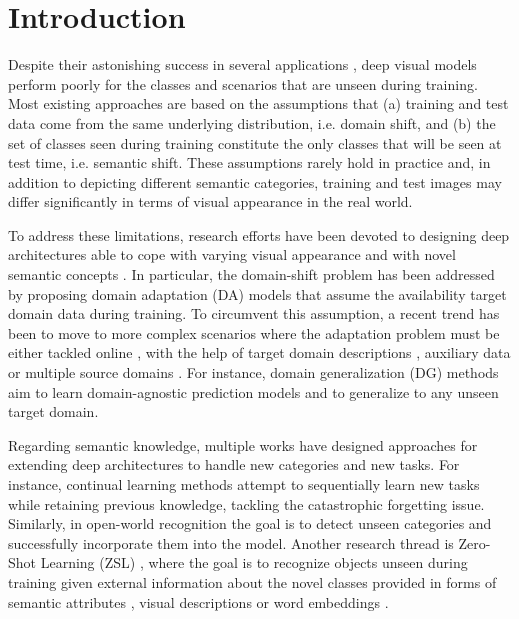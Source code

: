 \documentclass[runningheads]{llncs}
\begin{document}
\section{Introduction}
Despite their astonishing success in several applications \cite{girshick2015fast,redmon2016you}, deep visual models perform poorly for the classes and scenarios that are unseen during training. 
Most existing approaches are based on the assumptions that (a) training and test data come from the same underlying distribution, i.e. domain shift, and (b) the set of classes seen during training constitute the only classes that will be seen at test time, i.e. semantic shift.  
These assumptions rarely hold in practice and, in addition to depicting different semantic categories, training and test images may differ significantly in terms of visual appearance in the real world.


To address these limitations, research efforts have been devoted to designing deep architectures able to cope with varying visual appearance \cite{csurka2017domain} and with novel semantic concepts \cite{xian2018zeroshotgood}.
In particular, the domain-shift problem \cite{khosla2012undoing} has been addressed by proposing domain adaptation (DA) models \cite{csurka2017domain} that assume the availability target domain data during 
training. To circumvent this assumption, a recent trend has been to move to more complex scenarios where the adaptation problem must be either tackled online \cite{hoffman2014continuous,mancini2018kitting}, with the help of target domain descriptions \cite{mancini2019adagraph}, auxiliary data \cite{peng2018zero} 
or multiple source domains \cite{mancini2019inferring,mancini2018boosting,roy2019unsupervised}. For instance, domain generalization (DG) methods \cite{li2017deeper,li2019episodic,carlucci2019domain} aim to learn domain-agnostic prediction models and to generalize to any unseen target domain.

Regarding semantic knowledge, 
multiple works have 
designed approaches for extending deep architectures to handle new categories and new tasks. For instance, continual learning methods \cite{DeLange-CL-survey} attempt to sequentially learn new tasks 
while retaining previous knowledge, tackling the catastrophic forgetting issue. Similarly, in open-world recognition \cite{bendale2015towards} the goal is to detect 
unseen categories and successfully incorporate them into the model. Another research thread is Zero-Shot Learning (ZSL) \cite{xian2018zeroshotgood}, where the goal is to recognize objects unseen during training given external information about the novel classes provided in forms of semantic attributes \cite{lampert2013awa}, visual descriptions \cite{akata2015evaluation} or word embeddings \cite{mikolov2013efficient}.
\end{document}
